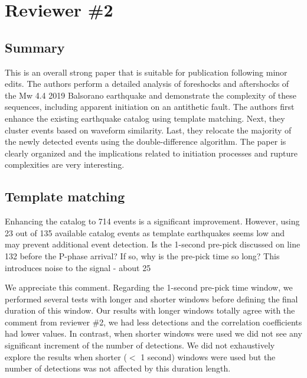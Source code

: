 \documentclass[10pt]{extarticle}
\begin{document}
\section*{Reviewer \#2}

\subsection*{Summary}

This is an overall strong paper that is suitable for publication following minor edits. The authors perform a detailed analysis of foreshocks and aftershocks of the Mw 4.4 2019 Balsorano earthquake and demonstrate the complexity of these sequences, including apparent initiation on an antithetic fault. The authors first enhance the existing earthquake catalog using template matching. Next, they cluster events based on waveform similarity. Last, they relocate the majority of the newly detected events using the double-difference algorithm. The paper is clearly organized and the implications related to initiation processes and rupture complexities are very interesting.  \\


\subsection*{Template matching}

\begin{ReviewerComment}{2}
\noindent
Enhancing the catalog to 714 events is a significant improvement. However, using 23 out of 135 available catalog events as template earthquakes seems low and may prevent additional event detection. Is the 1-second pre-pick discussed on line 132 before the P-phase arrival? If so, why is the pre-pick time so long? This introduces noise to the signal - about 25%

\end{ReviewerComment}


\begin{Answer}
We appreciate this comment. Regarding the 1-second pre-pick time window, we performed several tests with longer and shorter windows before defining the final duration of this window. Our results with longer windows totally agree with the comment from reviewer \#2, we had less detections and the correlation coefficients had lower values. In contrast, when shorter windows were used we did not see any significant increment of the number of detections. We did not exhaustively explore the results when shorter ($<$ 1 second) windows were used but the number of detections was not affected by this duration length.   
 \WorkInProgressRevTask
\end{Answer}
%
%
\end{document}
